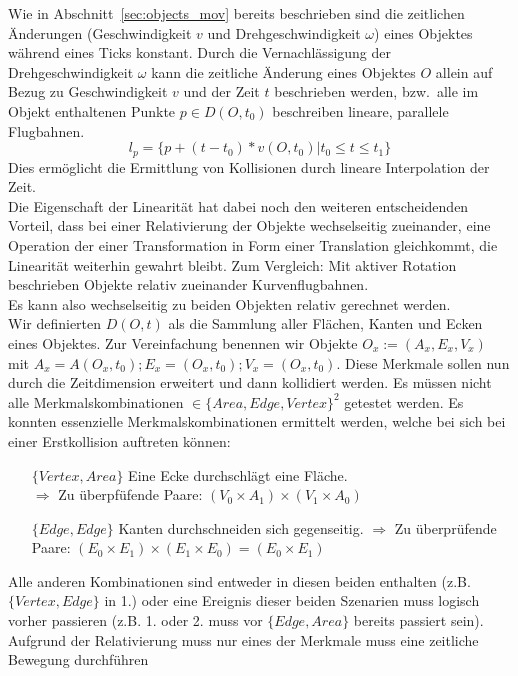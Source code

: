 Wie in Abschnitt~\ref{sec:objects_mov} bereits beschrieben sind die zeitlichen Änderungen (Geschwindigkeit $v$ und Drehgeschwindigkeit $\omega$) eines Objektes während eines Ticks konstant. Durch die Vernachlässigung der Drehgeschwindigkeit $\omega$ kann die zeitliche Änderung eines Objektes $O$ allein auf Bezug zu Geschwindigkeit $v$ und der Zeit $t$ beschrieben werden, bzw.~alle im Objekt enthaltenen Punkte $p \in D(O, t_0)$ beschreiben lineare, parallele Flugbahnen.
$$l_p = \{p + (t - t_0) * v(O, t_0) | t_0 \leq t \leq t_1\}$$ 
Dies ermöglicht die Ermittlung von Kollisionen durch lineare Interpolation der Zeit.\\
Die Eigenschaft der Linearität hat dabei noch den weiteren entscheidenden Vorteil, dass bei einer Relativierung der Objekte wechselseitig zueinander, eine Operation der einer Transformation in Form einer Translation gleichkommt, die Linearität weiterhin gewahrt bleibt. Zum Vergleich: Mit aktiver Rotation beschrieben Objekte relativ zueinander Kurvenflugbahnen.\\
Es kann also wechselseitig zu beiden Objekten relativ gerechnet werden.\\
Wir definierten $D(O, t)$ als die Sammlung aller Flächen, Kanten und Ecken eines Objektes. Zur Vereinfachung benennen wir Objekte $O_x := (A_x, E_x, V_x)$ mit $A_x = A(O_x, t_0); E_x = (O_x, t_0); V_x = (O_x, t_0)$. Diese Merkmale sollen nun durch die Zeitdimension erweitert und dann kollidiert werden.
Es müssen nicht alle Merkmalskombinationen $\in \{Area, Edge, Vertex\}^2$ getestet werden. Es konnten essenzielle Merkmalskombinationen ermittelt werden, welche bei sich bei einer Erstkollision auftreten können:
		\begin{itemize}
			\item [$\{Vertex, Area\}$] Eine Ecke durchschlägt eine Fläche.\\
				$\Rightarrow$ Zu überpfüfende Paare: $(V_0\times A_1)\times (V_1\times A_0)$
			\item [$\{Edge, Edge\}$] Kanten durchschneiden sich gegenseitig.
				$\Rightarrow$ Zu überprüfende Paare: $(E_0\times E_1)\times (E_1\times E_0) = (E_0\times E_1)$
		\end{itemize}
		Alle anderen Kombinationen sind entweder in diesen beiden enthalten (z.B. $\{Vertex, Edge\}$ in 1.) oder eine Ereignis dieser beiden Szenarien muss logisch vorher passieren (z.B. 1. oder 2. muss vor $\{Edge, Area\}$ bereits passiert sein).
\ \\
		Aufgrund der Relativierung muss nur eines der Merkmale muss eine zeitliche Bewegung durchführen
